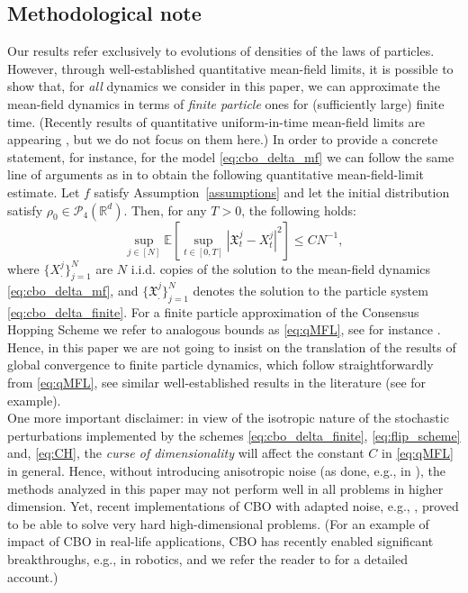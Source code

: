 \documentclass[reqno]{amsart}
\numberwithin{algorithm}{section}
\newcommand{\Xf}{{\mathfrak{X}}}
\begin{document}
{\subsection{Methodological note}\label{sec:methnote} Our results refer exclusively to evolutions of densities of the laws of particles. However, through well-established quantitative mean-field limits, it is possible to show that, for {\it all} dynamics we consider in this paper, we can approximate the mean-field dynamics in terms of {\it finite particle} ones for (sufficiently large) finite time. (Recently results of quantitative uniform-in-time  mean-field limits are appearing \cite{huang2025uniform, gerber2025uniform, bayraktar2025uniform}, but we do not focus on them here.) In order to provide a concrete statement, for instance, for the model \eqref{eq:cbo_delta_mf} we can follow the same line of arguments as in \cite[Theorem 2.6]{gerber_mean-field_2024} to obtain the following quantitative mean-field-limit estimate. Let $f$ satisfy Assumption~\ref{assumptions} and let the initial distribution satisfy $\rho_0 \in \mathcal{P}_{4}(\mathbb{R}^d)$. Then, for any $T > 0$, the following holds:
\begin{equation}\label{eq:qMFL}
\sup_{j \in [N]} \mathbb{E} \left[ \sup_{t \in [0,T]} |\Xf_t^j - X_t^j|^2 \right] \leq C N^{-1},
\end{equation}
where $\{X_.^j\}_{j=1}^N$ are $N$ i.i.d. copies of the solution to the mean-field dynamics \eqref{eq:cbo_delta_mf}, and $\{\Xf_.^j\}_{j=1}^N$ denotes the solution to the particle system \eqref{eq:cbo_delta_finite}.
For a finite particle approximation of the Consensus Hopping Scheme we refer to analogous bounds as \eqref{eq:qMFL}, see for instance \cite[Lemma D.3]{riedl_gradient_2023}.
Hence, in this paper we are not going to insist on the translation of the results of global convergence to finite particle dynamics, which follow straightforwardly from \eqref{eq:qMFL}, see similar well-established results in the literature (see \cite{B1-fornasier2021global,huang2025uniform} for example). \\
One more important  disclaimer: in view of the isotropic nature of the stochastic perturbations implemented by the schemes \eqref{eq:cbo_delta_finite}, \eqref{eq:flip_scheme} and, \eqref{eq:CH}, the {\it curse of dimensionality} will affect the constant $C$
in  \eqref{eq:qMFL} in general. Hence, without introducing anisotropic noise (as done, e.g., in \cite{B1-carrillo2019consensus,fornasier2021anisotropic}), the methods analyzed in this paper may not perform well in all problems in higher dimension. Yet, recent implementations of CBO with adapted noise, e.g., \cite{beddrich2024}, proved to be able to solve very hard high-dimensional problems. (For an example of impact of CBO in real-life applications, CBO has recently enabled significant breakthroughs, e.g., in robotics, and we refer the reader to \cite{sun2026CBOrob} for a detailed account.)\\
}
\end{document}
